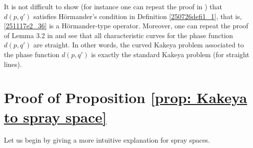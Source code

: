 \documentclass{article}
\numberwithin{equation}{section}
\theoremstyle{plain}
\begin{document}
It is not difficult to show (for instance one can repeat the proof in \cite[Section 5.2]{DGGZ24}) that $d(p, q')$ satisfies H\"ormander's condition in Definition \ref{250726defi1_1}, that is, \eqref{251117e2_36} is a H\"ormander-type operator. Moreover, one can repeat the proof of Lemma 3.2 in \cite{DGGZ24} and see that all characteristic curves for the phase function $d(p, q')$ are straight. In other words, the curved Kakeya problem associated to the phase function $d(p, q')$ is exactly the standard Kakeya problem (for straight lines). 










\section{Proof of Proposition \ref{prop: Kakeya to spray space}}\label{260526section3}




Let us begin by giving a more intuitive explanation for spray spaces. 
\end{document}
